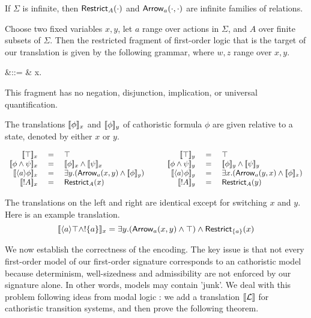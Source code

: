 \NI If $\Sigma$ is infinite, then $\mathsf{Restrict}_{A}(\cdot)$ and
$\mathsf{Arrow}_{a}(\cdot, \cdot)$ are infinite families of relations.

\begin{definition}
 Choose two fixed variables $x, y$, let $a$ range over actions in
$\Sigma$, and $A$ over finite subsets of $\Sigma$. Then the restricted
fragment of first-order logic that is the target of our translation is given by the
following grammar, where $w, z$ range over $x, y$.

\begin{GRAMMAR}
  \phi 
     &\quad ::= \quad&
  \top \fOr {}\fOr {} \fOr \phi \AND \psi \fOr \exists x. \phi 
\end{GRAMMAR}

\end{definition}

\NI This fragment has no negation, disjunction, implication, or
universal quantification.

\begin{definition}
The translations $\lbrack\!\lbrack \phi \rbrack\!\rbrack_x$ and $\lbrack\!\lbrack \phi \rbrack\!\rbrack_y$ of cathoristic formula 
$\phi$ are given relative to a state, denoted by either $x$ or $y$.

\[
\begin{array}{rclcrcl}
  \SEMB{\top}_x & \ = \ & \top  
     &\quad& 
  \SEMB{\top}_y & \ = \ & \top 
     \\
  \SEMB{\phi \AND \psi}_x & = & \SEMB{\phi}_x \AND \SEMB{\psi}_x  
     && 
  \SEMB{\phi \AND \psi}_y & = & \SEMB{\phi}_y \AND \SEMB{\psi}_y  
     \\
  \SEMB{\langle a \rangle \phi}_x & = & \exists y.(\ARROW{a}{x}{y} \AND \SEMB{\phi}_y)  
     &&
  \SEMB{\langle a \rangle \phi}_y & = & \exists x.(\ARROW{a}{y}{x} \AND \SEMB{\phi}_x)  
     \\
  \SEMB{\fBang A}_x & = & \RESTRICT{A}{x}
     &&
  \SEMB{\fBang A}_y & = & \RESTRICT{A}{y}
\end{array}
\]

\end{definition}

\NI The translations on the left and right are identical except for
switching $x$ and $y$. Here is an example translation.
\[
   \lbrack\!\lbrack \langle a \rangle \top \land ! \{a\} \rbrack\!\rbrack_x 
      = 
   \exists y.(\mathsf{Arrow}_{a}(x, y) \land \top ) \land \mathsf{Restrict}_{\{a\}}(x)
\]

\NI We now establish the correctness of the encoding. The key issue is
that not every first-order model of our first-order signature
corresponds to an cathoristic model because determinism, well-sizedness and
admissibility are not enforced by our signature alone. In other words,
models may contain 'junk'.  We deal with this problem following ideas
from modal logic \cite{BlackburnP:modlog}: we add a translation
$\lbrack\!\lbrack \mathcal{L} \rbrack\!\rbrack$ for cathoristic transition systems, and then prove the
following theorem.

